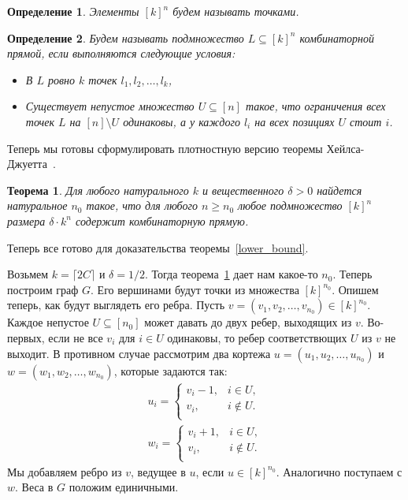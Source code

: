 \documentclass[12pt]{article}
\newtheorem{definition}{Определение}
\newtheorem{theorem}{Теорема}
\begin{document}
    \begin{definition}
        Элементы $[k]^n$ будем называть \emph{точками}.
    \end{definition}

    \begin{definition}
        Будем называть подмножество $L \subseteq [k]^n$ \emph{комбинаторной прямой},
        если выполняются следующие условия:
        \begin{itemize}
            \item В $L$ ровно $k$ точек $l_1, l_2, \ldots, l_k$,
            \item Существует непустое множество $U \subseteq [n]$ такое, что ограничения всех точек 
            $L$ на $[n] \setminus U$ одинаковы, а у каждого $l_i$ на всех позициях $U$ стоит $i$.
        \end{itemize}
    \end{definition}

    Теперь мы готовы сформулировать плотностную версию теоремы Хейлса-Джуетта~\cite{P09}.
    \begin{theorem}
        \label{density_hales_jewett}
        Для любого натурального $k$ и вещественного $\delta > 0$ найдется натуральное $n_0$ такое, что для
        любого $n \geq n_0$ любое подмножество $[k]^n$ размера $\delta \cdot k^n$ содержит комбинаторную
        прямую.
    \end{theorem}

    Теперь все готово для доказательства теоремы~\ref{lower_bound}.

    Возьмем $k = \lceil 2C \rceil$ и $\delta = 1/2$. Тогда теорема~\ref{density_hales_jewett}
    дает нам какое-то $n_0$. Теперь построим граф $G$. Его вершинами будут точки из множества
    $[k]^{n_0}$.
    Опишем теперь, как будут выглядеть его ребра. Пусть $v = (v_1, v_2, \ldots, v_{n_0}) \in [k]^{n_0}$.
    Каждое непустое $U \subseteq [n_0]$ может давать до двух ребер, выходящих из $v$.
    Во-первых, если не все $v_i$ для $i \in U$ одинаковы, то ребер соответствющих $U$ из $v$
    не выходит.
    В противном случае рассмотрим два кортежа
    $u = (u_1, u_2, \ldots, u_{n_0})$ и $w = (w_1, w_2, \ldots, w_{n_0})$,
    которые задаются так:
    \begin{eqnarray*}
        u_i = \begin{cases}
            v_i - 1, & i \in U,\\
            v_i, & i \notin U.\\
        \end{cases}\\
        w_i = \begin{cases}
            v_i + 1, & i \in U,\\
            v_i, & i \notin U.\\
        \end{cases}
    \end{eqnarray*}
    Мы добавляем ребро из $v$, ведущее в $u$, если $u \in [k]^{n_0}$. Аналогично поступаем с $w$.
    Веса в $G$ положим единичными.
\end{document}
